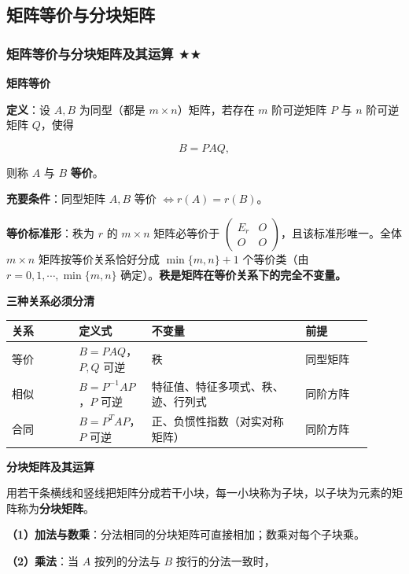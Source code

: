 \documentclass[11pt,openany,UTF8]{ctexbook}
\begin{document}
\subsection{矩阵等价与分块矩阵}

\subsubsection{矩阵等价与分块矩阵及其运算 $\bigstar$$\bigstar$}

\textbf{矩阵等价}

\textbf{定义}：设 $A,B$ 为同型（都是 $m\times n$）矩阵，若存在 $m$ 阶可逆矩阵 $P$ 与 $n$ 阶可逆矩阵 $Q$，使得

\[B=PAQ,\]

则称 $A$ 与 $B$ \textbf{等价}。

\textbf{充要条件}：同型矩阵 $A,B$ 等价 $\iff r(A)=r(B)$。

\textbf{等价标准形}：秩为 $r$ 的 $m\times n$ 矩阵必等价于 $\begin{pmatrix}E_r&O\\O&O\end{pmatrix}$，且该标准形唯一。全体 $m\times n$ 矩阵按等价关系恰好分成 $\min\{m,n\}+1$ 个等价类（由 $r=0,1,\cdots,\min\{m,n\}$ 确定）。\textbf{秩是矩阵在等价关系下的完全不变量。}

\textbf{三种关系必须分清}

\begingroup\small\setlength{\tabcolsep}{4.0pt}
\begin{longtable}{@{}L{0.1736\linewidth}L{0.1736\linewidth}L{0.3906\linewidth}L{0.1736\linewidth}@{}}
\toprule
\textbf{关系} & \textbf{定义式} & \textbf{不变量} & \textbf{前提} \\
\midrule
\endhead
等价 & $B=PAQ$，$P,Q$ 可逆 & 秩 & 同型矩阵 \\
相似 & $B=P^{-1}AP$，$P$ 可逆 & 特征值、特征多项式、秩、迹、行列式 & 同阶方阵 \\
合同 & $B=P^TAP$，$P$ 可逆 & 正、负惯性指数（对实对称矩阵） & 同阶方阵 \\
\bottomrule
\end{longtable}
\endgroup

\textbf{分块矩阵及其运算}

用若干条横线和竖线把矩阵分成若干小块，每一小块称为子块，以子块为元素的矩阵称为\textbf{分块矩阵}。

\textbf{（1）加法与数乘}：分法相同的分块矩阵可直接相加；数乘对每个子块乘。

\textbf{（2）乘法}：当 $A$ 按列的分法与 $B$ 按行的分法一致时，
\end{document}
